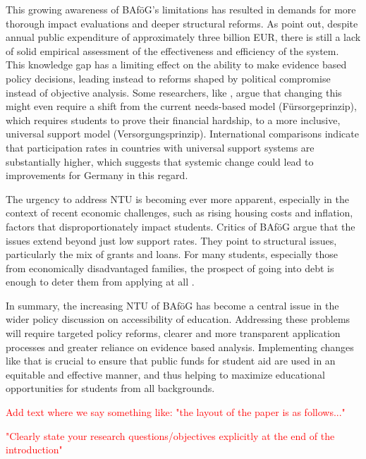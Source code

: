 This growing awareness of BAföG’s limitations has resulted in demands for more thorough impact evaluations and deeper structural reforms. As \cite{meier_bafog_2024} point out, despite annual public expenditure of approximately three billion EUR, there is still a lack of solid empirical assessment of the effectiveness and efficiency of the system. This knowledge gap has a limiting effect on the ability to make evidence based policy decisions, leading instead to reforms shaped by political compromise instead of objective analysis. Some researchers, like \cite{gwosc_krisenbewaltigung_2022}, argue that changing this might even require a shift from the current needs-based model (Fürsorgeprinzip), which requires students to prove their financial hardship, to a more inclusive, universal support model (Versorgungsprinzip). International comparisons indicate that participation rates in countries with universal support systems are substantially higher, which suggests that systemic change could lead to improvements for Germany in this regard.

The urgency to address NTU is becoming ever more apparent, especially in the context of recent economic challenges, such as rising housing costs and inflation, factors that disproportionately impact students. Critics of BAföG argue that the issues extend beyond just low support rates. They point to structural issues, particularly the mix of grants and loans. For many students, especially those from economically disadvantaged families, the prospect of going into debt is enough to deter them from applying at all \citep{staack_von_2017, gwosc_krisenbewaltigung_2022}.

In summary, the increasing NTU of BAföG has become a central issue in the wider policy discussion on accessibility of education. Addressing these problems will require targeted policy reforms, clearer and more transparent application processes and greater reliance on evidence based analysis. Implementing changes like that is crucial to ensure that public funds for student aid are used in an equitable and effective manner, and thus helping to maximize educational opportunities for students from all backgrounds.

\textcolor{red}{Add text where we say something like: "the layout of the paper is as follows..."}

\textcolor{red}{"Clearly state your research questions/objectives explicitly at the end of the introduction"}

